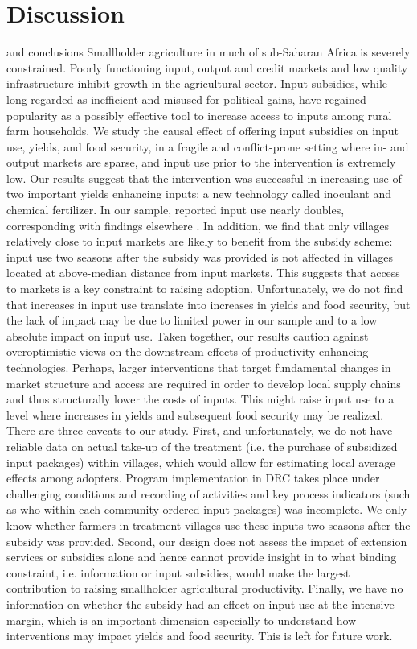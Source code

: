 \section{Discussion} and conclusions 
Smallholder agriculture in much of sub-Saharan Africa is severely constrained. Poorly functioning input, output and credit markets and low quality infrastructure inhibit growth in the agricultural sector. Input subsidies, while long regarded as inefficient and misused for political gains, have regained popularity as a possibly effective tool to increase access to inputs among rural farm households. We study the causal effect of offering input subsidies on input use, yields, and food security, in a fragile and conflict-prone setting where in- and output markets are sparse, and input use prior to the intervention is extremely low. 
Our results suggest that the intervention was successful in increasing use of two important yields enhancing inputs: a new technology called inoculant and chemical fertilizer. In our sample, reported input use nearly doubles, corresponding with findings elsewhere \citep{Carter2014,Brune2016}. In addition, we find that only villages relatively close to input markets are likely to benefit from the subsidy scheme: input use two seasons after the subsidy was provided is not affected in villages located at above-median distance from input markets. This suggests that access to markets is a key constraint to raising adoption. Unfortunately, we do not find that increases in input use translate into increases in yields and food security, but the lack of impact may be due to limited power in our sample and to a low absolute impact on input use. Taken together, our results caution against overoptimistic views on the downstream effects of productivity enhancing technologies. Perhaps, larger interventions that target fundamental changes in market structure and access are required in order to develop local supply chains and thus structurally lower the costs of inputs. This might raise input use to a level where increases in yields and subsequent food security may be realized. 
There are three caveats to our study. First, and unfortunately, we do not have reliable data on actual take-up of the treatment (i.e. the purchase of subsidized input packages) within villages, which would allow for estimating local average effects among adopters. Program implementation in DRC takes place under challenging conditions and recording of activities and key process indicators (such as who within each community ordered input packages) was incomplete. We only know whether farmers in treatment villages use these inputs two seasons after the subsidy was provided. Second, our design does not assess the impact of extension services or subsidies alone and hence cannot provide insight in to what binding constraint, i.e. information or input subsidies, would make the largest contribution to raising smallholder agricultural productivity. Finally, we have no information on whether the subsidy had an effect on input use at the intensive margin, which is an important dimension especially to understand how interventions may impact yields and food security. This is left for future work. 


